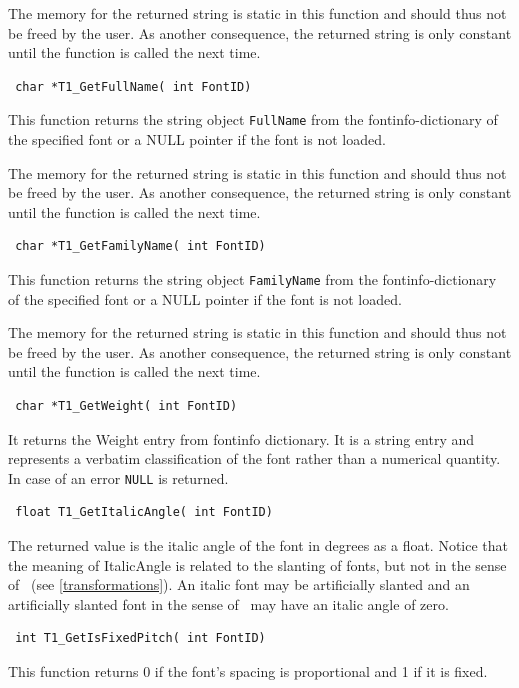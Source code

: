 The memory for the returned string is static in this function and should thus
not be freed by the user. As another consequence, the returned
string is only constant until the function is called the next time.

\precorr
\begin{verbatim}
 char *T1_GetFullName( int FontID)
\end{verbatim}\postcorr
This function returns the string object \verb+FullName+ from the
fontinfo-dictionary of the specified font or a NULL pointer if the font is not
loaded.

The memory for the returned string is static in this function and should thus
not be freed by the user. As another consequence, the returned
string is only constant until the function is called the next time.

\precorr
\begin{verbatim}
 char *T1_GetFamilyName( int FontID)
\end{verbatim}\postcorr
This function returns the string object \verb+FamilyName+ from the
fontinfo-dictionary of the specified font or a NULL pointer if the font is not
loaded.

The memory for the returned string is static in this function and should thus
not be freed by the user. As another consequence, the returned
string is only constant until the function is called the next time.

\precorr
\begin{verbatim}
 char *T1_GetWeight( int FontID)
\end{verbatim}\postcorr
It returns the Weight entry from fontinfo dictionary. It is a string
entry and represents a verbatim classification of the font rather than
a numerical quantity. In case of an error \verb+NULL+ is returned.

\precorr
\begin{verbatim}
 float T1_GetItalicAngle( int FontID)
\end{verbatim}\postcorr
The returned value is the italic angle of the font in degrees as a
float. Notice that the meaning of ItalicAngle is related to the slanting
of fonts, but not in the sense of \tonelib\ (see
\ref{transformations}). 
An italic font may be artificially slanted and an artificially slanted
font in the sense of \tonelib\ may have an italic angle of zero. 

\precorr
\begin{verbatim}
 int T1_GetIsFixedPitch( int FontID)
\end{verbatim}\postcorr
This function returns 0 if the font's spacing is proportional and 1 if
it is fixed. 

